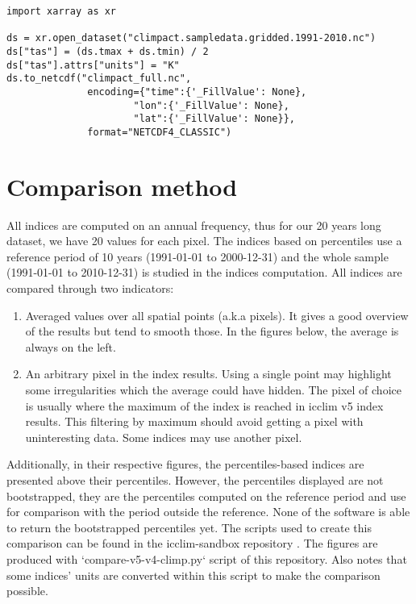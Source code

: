 \documentclass[a4paper,11pt]{article}
\begin{document}
        
        \begin{minipage}{\linewidth}
        \begin{lstlisting}
import xarray as xr

ds = xr.open_dataset("climpact.sampledata.gridded.1991-2010.nc")
ds["tas"] = (ds.tmax + ds.tmin) / 2
ds["tas"].attrs["units"] = "K"
ds.to_netcdf("climpact_full.nc",
              encoding={"time":{'_FillValue': None},
                      "lon":{'_FillValue': None},
                      "lat":{'_FillValue': None}},
              format="NETCDF4_CLASSIC")
        \end{lstlisting}
        \end{minipage}

    \section{Comparison method}
        All indices are computed on an annual frequency, thus for our 20 years long dataset, we have 20 values for each pixel.
        The indices based on percentiles use a reference period of 10 years (1991-01-01 to 2000-12-31) and the whole sample (1991-01-01 to 2010-12-31) is studied in the indices computation.
        All indices are compared through two indicators: 
        \begin{enumerate}
            \item Averaged values over all spatial points (a.k.a pixels). 
            It gives a good overview of the results but tend to smooth those. In the figures below, the average is always on the left.
            \item An arbitrary pixel in the index results. Using a single point may highlight some irregularities which the average could have hidden. 
            The pixel of choice is usually where the maximum of the index is reached in icclim v5 index results. This filtering by maximum should avoid getting a pixel with uninteresting data. Some indices may use another pixel.
        \end{enumerate}
        Additionally, in their respective figures, the percentiles-based indices are presented above their percentiles. However, the percentiles displayed are not bootstrapped, they are the percentiles computed on the reference period and use for comparison with the period outside the reference. None of the software is able to return the bootstrapped percentiles yet.
        The scripts used to create this comparison can be found in the icclim-sandbox repository \cite{gh/icclim_sandbox}.
        The figures are produced with `compare-v5-v4-climp.py` script of this repository.
        Also notes that some indices' units are converted within this script to make the comparison possible.
\end{document}
